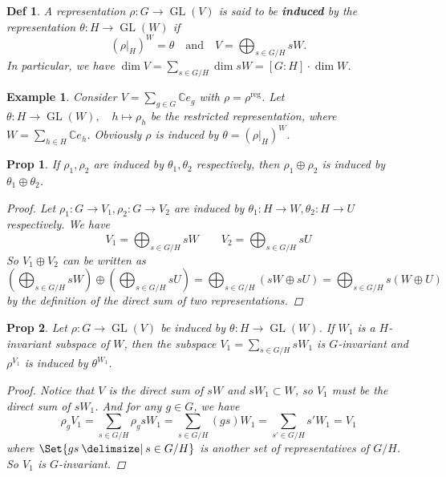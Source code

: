 \documentclass[a4paper]{article}
\newcommand*{\Cb}{\mathbb{C}}
\newcommand*\GL[1]{\operatorname{GL}\mathopen{}\left({#1}\right)\mathclose{}}
\providecommand\given{}
\newcommand*\SetSymbol[1][]{%
  \nonscript\:#1\vert
  \allowbreak
  \nonscript\:
\mathopen{}}
\renewcommand\given{\SetSymbol[\delimsize]}
\renewcommand\given{\SetSymbol[\delimsize]}
\theoremstyle{mystyle}
\newtheorem{definition}{Def}
\newtheorem{example}{Example}
\newtheorem{prop}{Prop}
\begin{document}
\begin{definition}
  A representation $\rho: G\to \GL{V}$ is said to be {\bf induced} by
  the representation $\theta: H\to \GL{W}$ if
  \[
    (\rho|_H)^W = \theta \quad \text{and} \quad V = \bigoplus_{s\in G/H} sW.
  \]
  In particular, we have
  $\displaystyle \dim V = \sum_{s\in G/H} \dim sW = [G:H] \cdot \dim W$.
\end{definition}

\begin{example}
  Consider $\displaystyle V = \sum_{g\in G} \Cb e_g$ with
  $\rho = \rho^\text{reg}$. Let $\theta: H\to \GL{W}, \quad h \mapsto \rho_h$
  be the restricted representation, where
  $\displaystyle W = \sum_{h\in H} \Cb e_h$. Obviously $\rho$ is
  induced by $\theta = (\rho|_H)^W$.
\end{example}

\begin{prop}
  If $\rho_1, \rho_2$ are induced by $\theta_1, \theta_2$ respectively, then
  $\rho_1 \oplus \rho_2$ is induced by $\theta_1 \oplus \theta_2$.

  \begin{proof}
    Let $\rho_1: G\to V_1, \rho_2: G\to V_2$ are induced by
    $\theta_1: H\to W, \theta_2: H\to U$ respectively. We have
    \[
      V_1 = \bigoplus_{s\in G/H} sW \qquad V_2 = \bigoplus_{s\in G/H} sU
    \]
    So $V_1 \oplus V_2$ can be written as
    \[
      \left(\bigoplus_{s\in G/H} sW\right) \oplus
      \left(\bigoplus_{s\in G/H} sU\right)
      = \bigoplus_{s\in G/H} (sW \oplus sU)
      = \bigoplus_{s\in G/H} s(W \oplus U)
    \]
    by the definition of the direct sum of two representations.
  \end{proof}
\end{prop}

\begin{prop}
  Let $\rho: G\to \GL{V}$ be induced by $\theta: H\to \GL{W}$. If $W_1$ is
  a $H$-invariant subspace of $W$, then the subspace
  $\displaystyle V_1 = \sum_{s \in G/H} sW_1$ is $G$-invariant and
  $\rho^{V_1}$ is induced by $\theta^{W_1}$.
  \begin{proof}
    Notice that $V$ is the direct sum of $sW$ and $sW_1 \subset W$, so
    $V_1$ must be the direct sum of $sW_1$. And for any $g\in G$, we have
    \[
      \rho_g V_1 = \sum_{s\in G/H} \rho_g sW_1
      = \sum_{s\in G/H} (gs)W_1
      = \sum_{s'\in G/H} s'W_1 = V_1
    \]
    where $\Set{ gs \given s\in G/H }$ is another set of representatives of
    $G/H$. So $V_1$ is $G$-invariant.
  \end{proof}
\end{prop}
\end{document}

